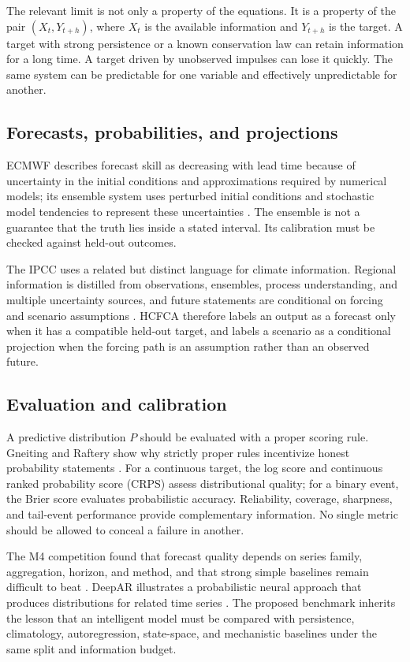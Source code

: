 \documentclass[conference]{IEEEtran}
\begin{document}
The relevant limit is not only a property of the equations. It is a property of the pair $(X_t,Y_{t+h})$, where $X_t$ is the available information and $Y_{t+h}$ is the target. A target with strong persistence or a known conservation law can retain information for a long time. A target driven by unobserved impulses can lose it quickly. The same system can be predictable for one variable and effectively unpredictable for another.

\subsection{Forecasts, probabilities, and projections}
ECMWF describes forecast skill as decreasing with lead time because of uncertainty in the initial conditions and approximations required by numerical models; its ensemble system uses perturbed initial conditions and stochastic model tendencies to represent these uncertainties \cite{ecmwf}. The ensemble is not a guarantee that the truth lies inside a stated interval. Its calibration must be checked against held-out outcomes.

The IPCC uses a related but distinct language for climate information. Regional information is distilled from observations, ensembles, process understanding, and multiple uncertainty sources, and future statements are conditional on forcing and scenario assumptions \cite{ipcc2021}. HCFCA therefore labels an output as a forecast only when it has a compatible held-out target, and labels a scenario as a conditional projection when the forcing path is an assumption rather than an observed future.

\subsection{Evaluation and calibration}
A predictive distribution $P$ should be evaluated with a proper scoring rule. Gneiting and Raftery show why strictly proper rules incentivize honest probability statements \cite{gneiting2007}. For a continuous target, the log score and continuous ranked probability score (CRPS) assess distributional quality; for a binary event, the Brier score evaluates probabilistic accuracy. Reliability, coverage, sharpness, and tail-event performance provide complementary information. No single metric should be allowed to conceal a failure in another.

The M4 competition found that forecast quality depends on series family, aggregation, horizon, and method, and that strong simple baselines remain difficult to beat \cite{makridakis2018}. DeepAR illustrates a probabilistic neural approach that produces distributions for related time series \cite{salinas2020}. The proposed benchmark inherits the lesson that an intelligent model must be compared with persistence, climatology, autoregression, state-space, and mechanistic baselines under the same split and information budget.
\end{document}

